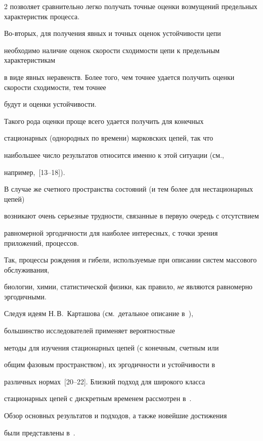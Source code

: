 \begin{multicols}{2}
позволяет сравнительно легко получать точные оценки возмущений предельных характеристик процесса.



Во-вторых, для получения явных и точных оценок устойчивости цепи

необходимо наличие оценок скорости сходимости цепи к предельным характеристикам

в виде явных неравенств. Более того, чем точнее удается получить оценки скорости сходимости, тем точнее

будут и оценки устой\-чи\-вости.



Такого рода оценки проще всего удается получить для конечных

стационарных (однородных по времени) марковских цепей, так что

наибольшее число результатов относится именно к этой ситуации (см.,

например,~[13--18]).



В случае же счетного пространства состояний (и тем более для нестационарных цепей)

возникают очень серьезные трудности, связанные в первую очередь с отсутствием

равномерной эргодичности для наиболее интересных, с точки зрения приложений, процессов.

Так, процессы рождения и гибели, используемые при описании систем массового обслуживания,

биологии, химии, статистической физики, как правило, {\it не} являются равномерно эргодичными.



Следуя идеям Н.\,В.~Карташова (см.\ детальное описание в~\cite{kar96}),

большинство исследователей применяет вероятностные

методы для изучения стационарных цепей (с конечным, счетным или

общим фазовым пространством), их эргодичности и устойчивости в

различных нормах~[20--22]. Близкий подход для широкого класса

стационарных цепей с дискретным временем рассмотрен в~\cite{mt}.

Обзор основных результатов и подходов, а также новейшие достижения

были представлены в~\cite{yl}.




\end{multicols}

